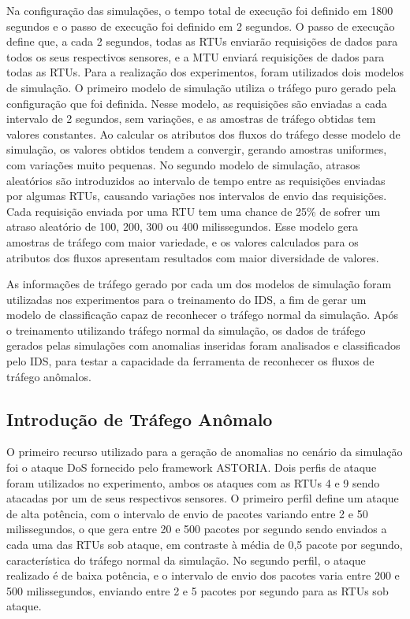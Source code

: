 \documentclass[cic,tc]{iiufrgs}
\begin{document}
Na configuração das simulações, o tempo total de execução foi definido em 1800 segundos e o passo de execução foi definido em 2 segundos. O passo de execução define que, a cada 2 segundos, todas as RTUs enviarão requisições de dados para todos os seus respectivos sensores, e a MTU enviará requisições de dados para todas as RTUs. Para a realização dos experimentos, foram utilizados dois modelos de simulação. O primeiro modelo de simulação utiliza o tráfego puro gerado pela configuração que foi definida. Nesse modelo, as requisições são enviadas a cada intervalo de 2 segundos, sem variações, e as amostras de tráfego obtidas tem valores constantes. Ao calcular os atributos dos fluxos do tráfego desse modelo de simulação, os valores obtidos tendem a convergir, gerando amostras uniformes, com variações muito pequenas. No segundo modelo de simulação, atrasos aleatórios são introduzidos ao intervalo de tempo entre as requisições enviadas por algumas RTUs, causando variações nos intervalos de envio das requisições. Cada requisição enviada por uma RTU tem uma chance de 25\% de sofrer um atraso aleatório de 100, 200, 300 ou 400 milissegundos. Esse modelo gera amostras de tráfego com maior variedade, e os valores calculados para os atributos dos fluxos apresentam resultados com maior diversidade de valores.

As informações de tráfego gerado por cada um dos modelos de simulação foram utilizadas nos experimentos para o treinamento do IDS, a fim de gerar um modelo de classificação capaz de reconhecer o tráfego normal da simulação. Após o treinamento  utilizando tráfego normal da simulação, os dados de tráfego gerados pelas simulações com anomalias inseridas foram analisados e classificados pelo IDS, para testar a capacidade da ferramenta de reconhecer os fluxos de tráfego anômalos.

\subsection{Introdução de Tráfego Anômalo}
\label{subattacks} 
O primeiro recurso utilizado para a geração de anomalias no cenário da simulação foi o ataque DoS fornecido pelo framework ASTORIA. Dois perfis de ataque foram utilizados no experimento, ambos os ataques com as RTUs 4 e 9 sendo atacadas por um de seus respectivos sensores. O primeiro perfil define um ataque de alta potência, com o intervalo de envio de pacotes variando entre 2 e 50 milissegundos, o que gera entre 20 e 500 pacotes por segundo sendo enviados a cada uma das RTUs sob ataque, em contraste à média de 0,5 pacote por segundo, característica do tráfego normal da simulação. No segundo perfil, o ataque realizado é de baixa potência, e o intervalo de envio dos pacotes varia entre 200 e 500 milissegundos, enviando entre 2 e 5 pacotes por segundo para as RTUs sob ataque.
\end{document}
